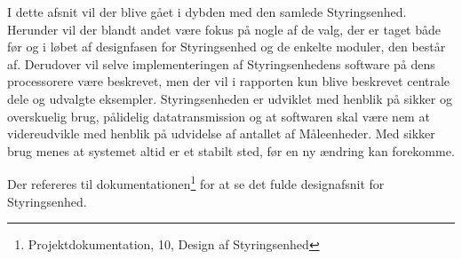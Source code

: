 
I dette afsnit vil der blive gået i dybden med den samlede Styringsenhed. Herunder vil der blandt andet være fokus på nogle af de valg, der er taget både før og i løbet af designfasen for Styringsenhed og de enkelte moduler, den består af. Derudover vil selve implementeringen af Styringsenhedens software på dens processorere være beskrevet, men der vil i rapporten kun blive beskrevet centrale dele og udvalgte eksempler. Styringsenheden er udviklet med henblik på sikker og overskuelig brug, pålidelig datatransmission og at softwaren skal være nem at videreudvikle med henblik på udvidelse af antallet af Måleenheder. Med sikker brug menes at systemet altid er et stabilt sted, før en ny ændring kan forekomme.



Der refereres til dokumentationen\footnote{Projektdokumentation, 10, Design af Styringsenhed} for at se det fulde designafsnit for Styringsenhed.

